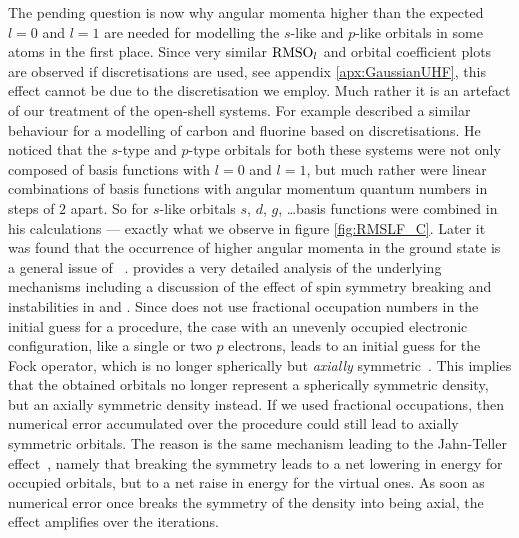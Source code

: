 
\label{sec:IssuesUHF}
The pending question is now why angular momenta higher than the expected
$l=0$ and $l=1$ are needed for modelling the $s$-like and $p$-like orbitals
in some atoms in the first place.
Since very similar $\text{RMSO}_l$ and \RMS orbital coefficient plots
are observed if \cGTO discretisations are used, see appendix \vref{apx:GaussianUHF},
this effect cannot be due to the \CS discretisation we employ.
Much rather it is an artefact of our \UHF treatment of the open-shell systems.
For example \citet{Cook1981} described a similar behaviour
for a \UHF modelling of carbon and fluorine
based on \cGTO discretisations.
He noticed that the $s$-type and $p$-type \SCF orbitals
for both these systems were not only
composed of \cGTO basis functions with $l=0$ and $l=1$,
but much rather were linear combinations of basis functions with
angular momentum quantum numbers in steps of $2$ apart.
So for $s$-like \SCF orbitals $s$, $d$, $g$, \ldots basis functions
were combined in his calculations ---
exactly what we observe in figure \ref{fig:RMSLF_C}.
Later it was found that the occurrence of higher angular momenta in
the ground state is a general issue of
\UHF~\cite{Fukutome1981,Cook1984,McWeeny1985}.
\citet{Fukutome1981} provides a very detailed analysis of the
underlying mechanisms including a discussion of the effect of
spin symmetry breaking and \HF instabilities in \UHF and \GUHF.
Since \molsturm does not use fractional occupation numbers in the initial
guess for a \UHF procedure,
the case with an unevenly occupied electronic configuration,
like a single or two $p$ electrons,
leads to an initial guess for the \UHF Fock operator,
which is no longer spherically but \emph{axially} symmetric~\cite{McWeeny1985}.
This implies that the obtained \SCF orbitals no longer represent
a spherically symmetric density, but an axially symmetric density instead.
If we used fractional occupations,
then numerical error accumulated over the \SCF procedure
could still lead to axially symmetric \SCF orbitals.
The reason is the same mechanism leading
to the Jahn-Teller effect~\cite{Jahn1937},
namely that breaking the symmetry
leads to a net lowering in energy for occupied \SCF orbitals,
but to a net raise in energy for the virtual ones.
As soon as numerical error once breaks the symmetry of the density
into being axial, the effect amplifies over the \UHF iterations.

